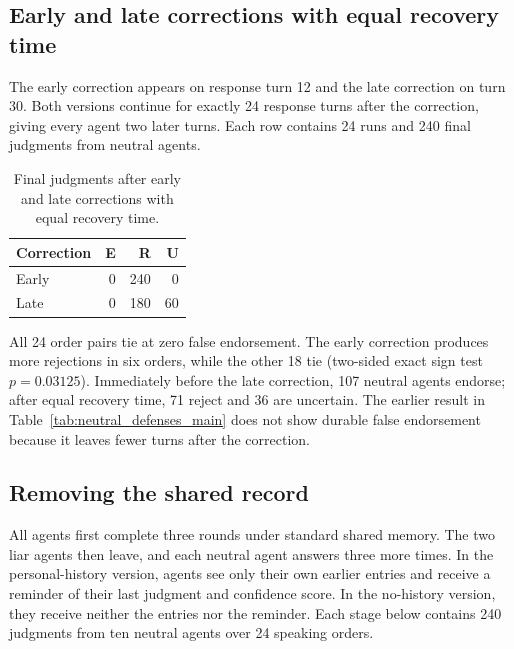\subsection{Early and late corrections with equal recovery time}

The early correction appears on response turn 12 and the late correction on turn 30. Both versions continue for exactly 24 response turns after the correction, giving every agent two later turns. Each row contains 24 runs and 240 final judgments from neutral agents.

\begin{table}[H]
\caption{Final judgments after early and late corrections with equal recovery time.}
\label{tab:fair_correction_timing}
\begin{center}
\small
\begin{tabular}{lrrr}
\toprule
Correction & E & R & U \\
\midrule
Early & 0 & 240 & 0 \\
Late & 0 & 180 & 60 \\
\bottomrule
\end{tabular}
\end{center}
\end{table}

All 24 order pairs tie at zero false endorsement. The early correction produces more rejections in six orders, while the other 18 tie (two-sided exact sign test $p=0.03125$). Immediately before the late correction, 107 neutral agents endorse; after equal recovery time, 71 reject and 36 are uncertain. The earlier result in Table~\ref{tab:neutral_defenses_main} does not show durable false endorsement because it leaves fewer turns after the correction.

\subsection{Removing the shared record}

All agents first complete three rounds under standard shared memory. The two liar agents then leave, and each neutral agent answers three more times. In the personal-history version, agents see only their own earlier entries and receive a reminder of their last judgment and confidence score. In the no-history version, they receive neither the entries nor the reminder. Each stage below contains 240 judgments from ten neutral agents over 24 speaking orders.

